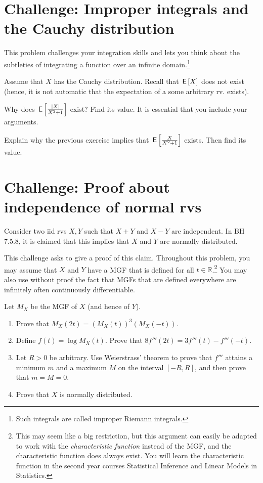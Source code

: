 \section{Challenge: Improper integrals and the Cauchy distribution}

This problem challenges your integration skills and lets you think about the subtleties of integrating a function over an infinite domain.\footnote{Such integrals are called improper Riemann integrals.}

Assume that $X$ has the Cauchy distribution.
Recall that $\,\mathsf{E}\left[X\right]$ does not exist (hence, it is not automatic that the expectation of a some arbitrary rv.
exists).
\begin{exercise}
Why does $\,\mathsf{E}\left[\frac{|X|}{X^2+1}\right]$ exist? Find its value. It is essential that you include your arguments.
\end{exercise}


\begin{exercise}
Explain why the previous exercise implies that $\,\mathsf{E}\left[\frac{X}{X^2+1}\right]$ exists. Then find its value.
\end{exercise}


\section{Challenge: Proof about independence of normal rvs}

Consider two iid rvs $X, Y$ such that $X+Y$ and $X-Y$ are independent. In BH 7.5.8, it is claimed that this implies that $X$ and $Y$ are normally distributed.

This challenge asks to give a proof of this claim. Throughout this problem, you may assume that $X$ and $Y$ have a MGF that is defined for all $t \in \mathbb R$.\footnote{This may seem like a big restriction, but this argument can easily be adapted to work with the \textit{characteristic function} instead of the MGF, and the characteristic function does always exist. You will learn the characteristic function in the second year courses Statistical Inference and Linear Models in Statistics.} You may also use without proof the fact that MGFs that are defined everywhere are infinitely often continuously differentiable.

\begin{exercise}
Let $M_X$ be the MGF of $X$ (and hence of $Y$).
\begin{enumerate}
\item Prove that $M_X(2t) = (M_X(t))^3(M_X(-t))$.
\item Define $f(t) = \log M_X(t)$. Prove that $8f'''(2t) = 3f'''(t) - f'''(-t)$.
\item Let $R > 0$ be arbitrary. Use Weierstrass' theorem to prove that $f'''$ attains a minimum $m$ and a maximum $M$ on the interval $[-R, R]$, and then prove that $m = M = 0$.
\item Prove that $X$ is normally distributed.
\end{enumerate}
\end{exercise}





